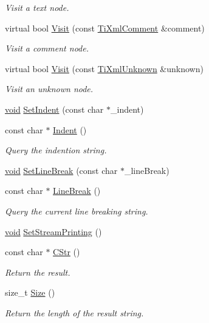 \begin{DoxyCompactItemize}
\begin{DoxyCompactList}\small\item\em Visit a text node. \end{DoxyCompactList}\item 
virtual bool \hyperlink{class_ti_xml_printer_a83c13d6b980064b30f989f9a35498979}{Visit} (const \hyperlink{class_ti_xml_comment}{Ti\-Xml\-Comment} \&comment)
\begin{DoxyCompactList}\small\item\em Visit a comment node. \end{DoxyCompactList}\item 
virtual bool \hyperlink{class_ti_xml_printer_ad2dca6dd106e8982fd3c7db1f3330970}{Visit} (const \hyperlink{class_ti_xml_unknown}{Ti\-Xml\-Unknown} \&unknown)
\begin{DoxyCompactList}\small\item\em Visit an unknown node. \end{DoxyCompactList}\item 
\hyperlink{wglew_8h_aeea6e3dfae3acf232096f57d2d57f084}{void} \hyperlink{class_ti_xml_printer_a213377a4070c7e625bae59716b089e5e}{Set\-Indent} (const char $\ast$\-\_\-indent)
\item 
const char $\ast$ \hyperlink{class_ti_xml_printer_abb33ec7d4bad6aaeb57f4304394b133d}{Indent} ()
\begin{DoxyCompactList}\small\item\em Query the indention string. \end{DoxyCompactList}\item 
\hyperlink{wglew_8h_aeea6e3dfae3acf232096f57d2d57f084}{void} \hyperlink{class_ti_xml_printer_a4be1e37e69e3858c59635aa947174fe6}{Set\-Line\-Break} (const char $\ast$\-\_\-line\-Break)
\item 
const char $\ast$ \hyperlink{class_ti_xml_printer_a11f1b4804a460b175ec244eb5724d96d}{Line\-Break} ()
\begin{DoxyCompactList}\small\item\em Query the current line breaking string. \end{DoxyCompactList}\item 
\hyperlink{wglew_8h_aeea6e3dfae3acf232096f57d2d57f084}{void} \hyperlink{class_ti_xml_printer_ab23a90629e374cb1cadca090468bbd19}{Set\-Stream\-Printing} ()
\item 
const char $\ast$ \hyperlink{class_ti_xml_printer_a859eede9597d3e0355b77757be48735e}{C\-Str} ()
\begin{DoxyCompactList}\small\item\em Return the result. \end{DoxyCompactList}\item 
size\-\_\-t \hyperlink{class_ti_xml_printer_ad01375ae9199bd2f48252eaddce3039d}{Size} ()
\begin{DoxyCompactList}\small\item\em Return the length of the result string. \end{DoxyCompactList}\end{DoxyCompactItemize}


